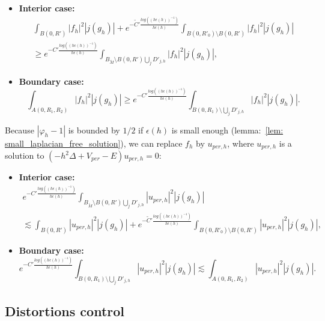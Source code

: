 \documentclass[leqno,11pt,letterpaper, english]{amsart}
\theoremstyle{plain}
\theoremstyle{definition}
\numberwithin{equation}{section}
\begin{document}
\begin{itemize}
	\item \textbf{Interior case:}\\
	\begin{multline}
		\int_{B(0,R')} |f_{h}|^2|j(g_h)|+e^{-\tilde{C}' \frac{log((h\epsilon(h))^{-1})}{h\epsilon(h)}}\int_{B(0,R'_0)\setminus B(0,R')}|f_h|^2|j(g_h)| \\
		\geq e^{-C' \frac{log((h\epsilon(h))^{-1})}{h\epsilon(h)}}\int_{B_{ \tilde{M}}\setminus B(0,R')\bigcup_j D'_{j,h} }|f_h|^2|j(g_h)|,
	\end{multline}
	\item \textbf{Boundary case:}\\
	\begin{equation}
		\int_{A(0,R_1,R_2)} |f_{h}|^2|j(g_h)|\geq e^{-C'\frac{log((h\epsilon(h))^{-1})}{h\epsilon(h)}}\int_{B(0,R_1)\setminus \bigcup_j D'_{j,h}} |f_{h}|^2|j(g_h)|.
	\end{equation}
\end{itemize}
	
Because $| \varphi_h - 1 |$ is bounded by $1/2$ if $\epsilon(h)$  is small enough (lemma:~\ref{lem: small_laplacian_free_solution}), we can replace $f_h$ by $u_{per,h}$, where $u_{per,h}$ is a solution to $(-h^2\Delta + V_{per} - E)u_{per,h} = 0$:

\begin{itemize}
	\item \textbf{Interior case:}\\
		\begin{multline}
		\label{eq: ineg carleman avec j(g)}
		e^{-C' \frac{log((h\epsilon(h))^{-1})}{h\epsilon(h)}}\int_{B_{ \tilde{M}}\setminus B(0,R')\bigcup_j D'_{j,h} }|u_{per,h}|^2|j(g_h)|
		\\ \lesssim \int_{B(0,R')} |u_{per,h}|^2|j(g_h)|+e^{-\tilde{C}' \frac{log((h\epsilon(h))^{-1})}{h\epsilon(h)}}\int_{B(0,R'_0)\setminus B(0,R')}|u_{per,h}|^2|j(g_h)|, 
	\end{multline}
	\item \textbf{Boundary case:}\\
	\begin{equation}
		e^{-C'\frac{log((h\epsilon(h))^{-1})}{h\epsilon(h)}}\int_{B(0,R_1)\setminus \bigcup_j D'_{j,h}} |u_{per,h}|^2|j(g_h)|\lesssim \int_{A(0,R_1,R_2)} |u_{per,h}|^2|j(g_h)|.
	\end{equation}
\end{itemize}
	
\subsection{Distortions control}
\label{subsect: Gag-Nir-Caccio}
\end{document}
